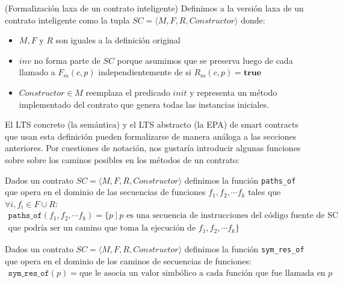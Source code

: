 \begin{definition}(Formalización laxa de un contrato inteligente)
    \label{definicion-laxa-smart-contract}
    Definimos a la versión laxa de un contrato inteligente como la tupla $SC = \langle M, F, R, Constructor \rangle$ donde:
    \begin{itemize}
        \item $M, F$ y $R$ son iguales a la definición original
        \item $inv$ no forma parte de $SC$ porque asumimos que se preserva luego de cada llamado a $F_m(c,p)$ independientemente de si $R_m(c,p) = \textbf{true}$
        \item $Constructor \in M$ reemplaza el predicado $init$ y representa un método implementado del contrato que genera todas las instancias iniciales.
    \end{itemize}
\end{definition}
El LTS concreto (la semántica) y el LTS abstracto (la EPA) de smart contracts que usan esta definición pueden formalizarse de manera análoga a las secciones anteriores.
Por cuestiones de notación, nos gustaría introducir algunas funciones sobre sobre los caminos posibles en los métodos de un contrato:
\begin{definition}
    Dados un contrato $SC = \langle M, F, R, Constructor \rangle$ definimos la función \texttt{paths\_of} que opera en el dominio de las secuencias de funciones $f_1, f_2, \cdots f_k$ tales que $\forall i, f_i \in F \cup R$:
    \begin{multline}
        \texttt{paths\_of}(f_1, f_2, \cdots f_k) = \{p \: | \: p \text{ es una secuencia de instrucciones del código fuente de SC} \\
        \text{que podría ser un camino que toma la ejecución de } f_1, f_2, \cdots f_k \}
    \end{multline}
\end{definition}
\begin{definition}
    Dados un contrato $SC = \langle M, F, R, Constructor \rangle$ definimos la función \texttt{sym\_res\_of} que opera en el dominio de los caminos de secuencias de funciones:
    \begin{multline}
        \texttt{sym\_res\_of}(p) = \text{que le asocia un valor simbólico a cada función que fue llamada en }p
    \end{multline}
\end{definition}

